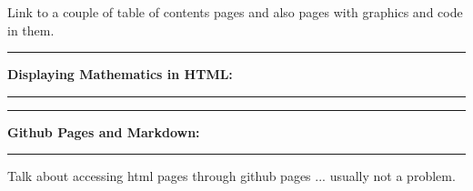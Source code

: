 \documentclass[10pt,fleqn]{article}
\begin{document}
Link to a couple of table of contents pages and also pages with graphics and
code in them.


\vskip0.1in\hrule\vskip0.1in \noindent
{\bf Displaying Mathematics in HTML:}
\vskip0.1in\hrule\vskip0.1in \noindent
\vskip0.1in\hrule\vskip0.1in \noindent
{\bf Github Pages and Markdown:}
\vskip0.1in\hrule\vskip0.1in \noindent
Talk about accessing html pages through github pages ... usually not a problem.
\end{document}
